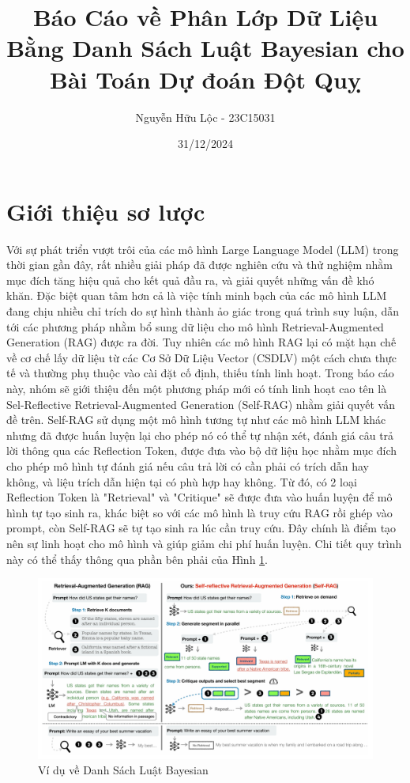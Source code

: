 \documentclass{article}
\title{Báo Cáo về Phân Lớp Dữ Liệu Bằng Danh Sách Luật Bayesian cho Bài Toán Dự đoán Đột Quỵ}
\author{Nguyễn Hữu Lộc - 23C15031}
\date{31/12/2024}
\begin{document}
\maketitle

\tableofcontents


\section{Giới thiệu sơ lược}
Với sự phát triển vượt trôi của các mô hình Large Language Model (LLM) trong thời gian gần đây, rất nhiều giải pháp đã được nghiên cứu và thử nghiệm nhằm mục đích tăng hiệu quả cho kết quả đầu ra, và giải quyết những vấn đề khó khăn. Đặc biệt quan tâm hơn cả là việc tính minh bạch của các mô hình LLM đang chịu nhiều chỉ trích do sự hình thành ảo giác trong quá trình suy luận, dẫn tới các phương pháp nhằm bổ sung dữ liệu cho mô hình Retrieval-Augmented Generation (RAG) được ra đời. Tuy nhiên các mô hình RAG lại có mặt hạn chế về cơ chế lấy dữ liệu từ các Cơ Sở Dữ Liệu Vector (CSDLV) một cách chưa thực tế và thường phụ thuộc vào cài đặt cố định, thiếu tính linh hoạt. Trong báo cáo này, nhóm sẽ giới thiệu đến một phương pháp mới có tính linh hoạt cao tên là Sel-Reflective Retrieval-Augmented Generation (Self-RAG) nhằm giải quyết vấn đề trên. Self-RAG sử dụng một mô hình tương tự như các mô hình LLM khác nhưng đã được huấn luyện lại cho phép nó có thể tự nhận xét, đánh giá câu trả lời thông qua các Reflection Token, được đưa vào bộ dữ liệu học nhằm mục đích cho phép mô hình tự đánh giá nếu câu trả lời có cần phải có trích dẫn hay không, và liệu trích dẫn hiện tại có phù hợp hay không. Từ đó, có 2 loại Reflection Token là "Retrieval" và "Critique" sẽ được đưa vào huấn luyện để mô hình tự tạo sinh ra, khác biệt so với các mô hình là truy cứu RAG rồi ghép vào prompt, còn Self-RAG sẽ tự tạo sinh ra lúc cần truy cứu. Đây chính là điểm tạo nên sự linh hoạt cho mô hình và giúp giảm chi phí huấn luyện. Chi tiết quy trình này có thể thấy thông qua phần bên phải của Hình \ref{fig:overview_self_rag}.

\begin{figure} 
    \centering
    \includegraphics[scale = 0.2]{overview_self_rag.jpeg}
    \caption{Ví dụ về Danh Sách Luật Bayesian}
    \label{fig:overview_self_rag}
\end{figure}
\end{document}
